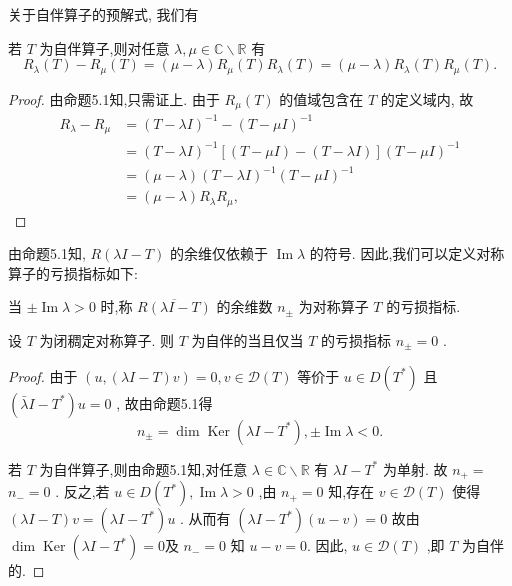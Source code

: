 \documentclass[lang=cn,newtx,10pt,scheme=chinese,thmcnt=chapter]{elegantbook}
\renewcommand{\Im}{\operatorname{Im}}
\begin{document}
关于自伴算子的预解式, 我们有
\begin{theorem}
     若 \(T\) 为自伴算子,则对任意 \(\lambda ,\mu  \in  \mathbb{C} \smallsetminus  \mathbb{R}\) 有
\begin{equation*}
{R}_{\lambda }\left( T\right)  - {R}_{\mu }\left( T\right)  = \left( {\mu  - \lambda }\right) {R}_{\mu }\left( T\right) {R}_{\lambda }\left( T\right)  = \left( {\mu  - \lambda }\right) {R}_{\lambda }\left( T\right) {R}_{\mu }\left( T\right) . \label{5.10}
\end{equation*}

\end{theorem}
\begin{proof}
    由命题5.1知,只需证上. 由于 \({R}_{\mu }\left( T\right)\) 的值域包含在 \(T\) 的定义域内, 故
    \begin{equation*}
        \begin{aligned}
R_\lambda-R_\mu & =(T-\lambda I)^{-1}-(T-\mu I)^{-1} \\
& =(T-\lambda I)^{-1}[(T-\mu I)-(T-\lambda I)](T-\mu I)^{-1} \\
& =(\mu-\lambda)(T-\lambda I)^{-1}(T-\mu I)^{-1} \\
& =(\mu-\lambda) R_\lambda R_\mu,
\end{aligned}
    \end{equation*}



\end{proof}


由命题5.1知, \(R\left( {{\lambda I} - T}\right)\) 的余维仅依赖于 \({\Im\lambda }\) 的符号. 因此,我们可以定义对称算子的亏损指标如下:
\begin{definition}
    当 \(\pm  \Im\lambda  > 0\) 时,称 \(\overline{R\left( {{\lambda I} - T}\right) }\) 的余维数 \({n}_{ \pm  }\) 为对称算子 \(T\) 的亏损指标.
\end{definition}
\begin{proposition}
    设 \(T\) 为闭稠定对称算子. 则 \(T\) 为自伴的当且仅当 \(T\) 的亏损指标 \({n}_{ \pm  } = 0\) .
\end{proposition}
\begin{proof}
    由于 \(\left( {u,\left( {{\lambda I} - T}\right) v}\right)  = 0,v \in  \mathcal{D}(T)\) 等价于 \(u \in  D\left( {T}^{ * }\right)\) 且 \(\left( {\bar{\lambda }I - {T}^{ * }}\right) u = 0\) , 故由命题5.1得
\begin{equation*}
{n}_{ \pm  } = \dim \operatorname{Ker}\left( {{\lambda I} - {T}^{ * }}\right) , \pm  \Im\lambda  < 0. \label{5.11}
\end{equation*}

若 \(T\) 为自伴算子,则由命题5.1知,对任意 \(\lambda  \in  \mathbb{C} \smallsetminus  \mathbb{R}\) 有 \({\lambda I} - {T}^{ * }\) 为单射. 故 \({n}_{ + } =\)  \({n}_{ - } = 0\) . 反之,若 \(u \in  D\left( {T}^{ * }\right) ,\Im\lambda  > 0\) ,由 \({n}_{ + } = 0\) 知,存在 \(v \in  \mathcal{D}(T)\) 使得 \(({\lambda I} - {T})v = \left( {{\lambda I} - {T}^{ * }}\right) u\text{ . 从而有 }\left( {{\lambda I} - {T}^{ * }}\right) \left( {u - v}\right)  = 0\) 故由$ \dim \operatorname{Ker}\left( {{\lambda I} - {T}^{ * }}\right) =0$及 \({n}_{ - } = 0\text{ 知 }u - v = 0\). 因此, \(u \in  \mathcal{D}(T)\) ,即 \(T\) 为自伴的.
\end{proof}
\end{document}
